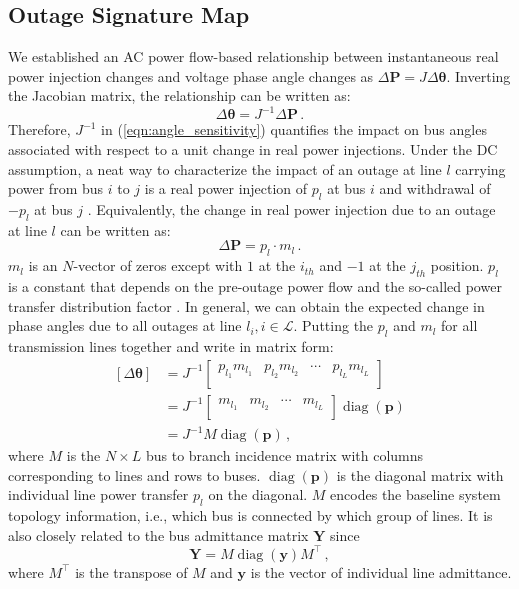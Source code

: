 \subsection{Outage Signature Map}
We established an AC power flow-based relationship between instantaneous real power injection changes and voltage phase angle changes as $\Delta\textbf{P} = {J} \Delta\boldsymbol{\theta}$. Inverting the Jacobian matrix, the relationship can be written as:
\begin{equation}
\label{eqn:angle_sensitivity}
\Delta\boldsymbol{\theta}  = {J}^{-1} \Delta\textbf{P} \,.
\end{equation}
Therefore, ${J}^{-1}$ in (\ref{eqn:angle_sensitivity}) quantifies the impact on bus angles associated with respect to a unit change in real power injections. Under the DC assumption, a neat way to characterize the impact of an outage at line $l$ carrying power from bus $i$ to $j$ is a real power injection of $p_{l}$ at bus $i$ and withdrawal of $-p_{l}$ at bus $j$ \cite{wood2013power}. Equivalently, the change in real power injection due to an outage at line $l$ can be written as:
$$
\Delta \textbf{P} = p_{l} \cdot m_l \,.
$$ 
$m_l$ is an $N$-vector of zeros except with $1$ at the $i_{th}$ and $-1$ at the $j_{th}$ position. $p_l$ is a constant that depends on the pre-outage power flow and the so-called power transfer distribution factor \cite{liu2004role}. In general, we can obtain the expected change in phase angles due to all outages at line $l_i, i \in \mathcal{L}$. Putting the $p_{l}$ and $m_l$ for all transmission lines together and write in matrix form:
\begin{align}
\label{eqn:complete_map}
    [\Delta\boldsymbol{\theta}] 
    &= {J}^{-1} 
    \begin{bmatrix} p_{l_1} m_{l_1} & p_{l_2} m_{l_2} & \cdots & p_{l_L} m_{l_L}\\ 
    \end{bmatrix} \nonumber\\ 
    &= {J}^{-1} 
    \begin{bmatrix} m_{l_1} & m_{l_2} & \cdots & m_{l_L} \\
    \end{bmatrix} \operatorname{ diag}(\boldsymbol{p}) \nonumber\\
    &= {J}^{-1} M \operatorname{ diag}(\boldsymbol{p}) \,, 
\end{align}
where $M$ is the $N \times L$ bus to branch incidence matrix with columns corresponding to lines and rows to buses. $\operatorname{diag}(\boldsymbol{p})$ is the diagonal matrix with individual line power transfer $p_l$ on the diagonal. $M$ encodes the baseline system topology information, i.e., which bus is connected by which group of lines. It is also closely related to the bus admittance matrix $\boldsymbol{Y}$ since 
\begin{equation}
\label{eqn:admittance_matrix}
\boldsymbol{Y} = M \operatorname{diag}(\mathbf{y}) M^{\top} \,,
\end{equation}
where ${M}^{\top}$ is the transpose of ${M}$ and $\mathbf{y}$ is the vector of individual line admittance. 

